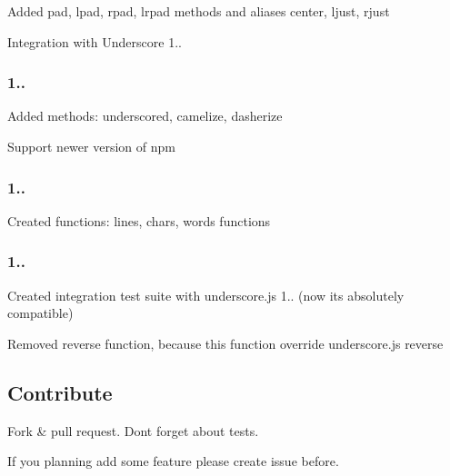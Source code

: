 \begin{DoxyItemize}
\item Added pad, lpad, rpad, lrpad methods and aliases center, ljust, rjust
\item Integration with Underscore 1..
\end{DoxyItemize}

\subsubsection*{1..}


\begin{DoxyItemize}
\item Added methods\+: underscored, camelize, dasherize
\item Support newer version of npm
\end{DoxyItemize}

\subsubsection*{1..}


\begin{DoxyItemize}
\item Created functions\+: lines, chars, words functions
\end{DoxyItemize}

\subsubsection*{1..}


\begin{DoxyItemize}
\item Created integration test suite with underscore.\+js 1.. (now it\textquotesingle{}s absolutely compatible)
\item Removed \textquotesingle{}reverse\textquotesingle{} function, because this function override underscore.\+js \textquotesingle{}reverse\textquotesingle{}
\end{DoxyItemize}

\subsection*{Contribute}


\begin{DoxyItemize}
\item Fork \& pull request. Don\textquotesingle{}t forget about tests.
\item If you planning add some feature please create issue before.
\end{DoxyItemize}

